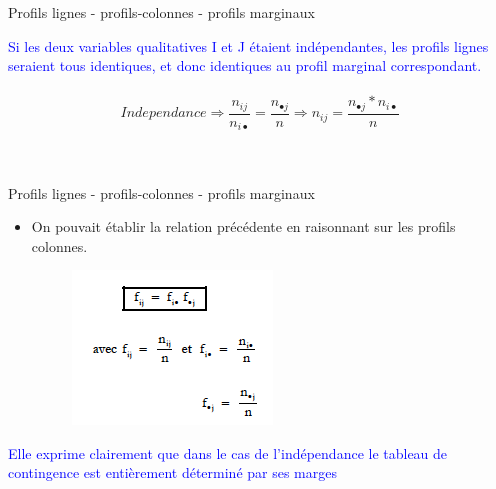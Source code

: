 \documentclass[10pt]{beamer}
\begin{document}
%
%


\begin{frame}{Profils lignes - profils-colonnes - profils
marginaux}

\textcolor{blue}{Si les deux variables qualitatives I et J étaient indépendantes, les profils lignes seraient tous identiques, et donc identiques au profil marginal
correspondant.}\\~\\

$$Independance \Rightarrow \frac{n_{ij}}{n_{i \bullet}}=\frac{n_{\bullet j}}{n} \Rightarrow n_{ij}=\frac{n_{\bullet j}*n_{i \bullet}}{n}$$\\~\\

\end{frame}


\begin{frame}{Profils lignes - profils-colonnes - profils
marginaux}

\begin{itemize}
\item  On pouvait établir la relation précédente en raisonnant sur les profils colonnes.
 
\begin{figure}
\includegraphics[scale=0.7]{Exemple5.png}  
\end{figure}
\end{itemize}

\textcolor{blue}{Elle exprime clairement que dans le cas de l’indépendance le tableau de contingence est entièrement déterminé par ses marges
}
\end{frame}
\end{document}
